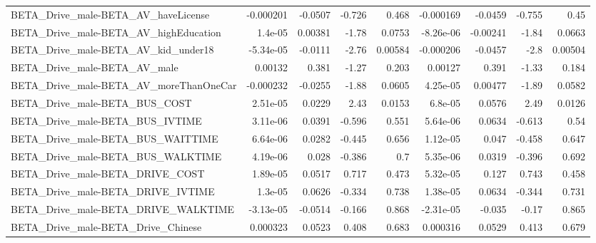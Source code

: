 \begin{tabular}{lrrrrrrrr}
BETA\_Drive\_male-BETA\_AV\_haveLicense                &   -0.000201 &      -0.0507 &   -0.726 &    0.468 &  -0.000169 &     -0.0459 &       -0.755 &          0.45 \\
BETA\_Drive\_male-BETA\_AV\_highEducation              &     1.4e-05 &      0.00381 &    -1.78 &   0.0753 &  -8.26e-06 &    -0.00241 &        -1.84 &        0.0663 \\
BETA\_Drive\_male-BETA\_AV\_kid\_under18                &   -5.34e-05 &      -0.0111 &    -2.76 &  0.00584 &  -0.000206 &     -0.0457 &         -2.8 &       0.00504 \\
BETA\_Drive\_male-BETA\_AV\_male                       &     0.00132 &        0.381 &    -1.27 &    0.203 &    0.00127 &       0.391 &        -1.33 &         0.184 \\
BETA\_Drive\_male-BETA\_AV\_moreThanOneCar             &   -0.000232 &      -0.0255 &    -1.88 &   0.0605 &   4.25e-05 &     0.00477 &        -1.89 &        0.0582 \\
BETA\_Drive\_male-BETA\_BUS\_COST                      &    2.51e-05 &       0.0229 &     2.43 &   0.0153 &    6.8e-05 &      0.0576 &         2.49 &        0.0126 \\
BETA\_Drive\_male-BETA\_BUS\_IVTIME                    &    3.11e-06 &       0.0391 &   -0.596 &    0.551 &   5.64e-06 &      0.0634 &       -0.613 &          0.54 \\
BETA\_Drive\_male-BETA\_BUS\_WAITTIME                  &    6.64e-06 &       0.0282 &   -0.445 &    0.656 &   1.12e-05 &       0.047 &       -0.458 &         0.647 \\
BETA\_Drive\_male-BETA\_BUS\_WALKTIME                  &    4.19e-06 &        0.028 &   -0.386 &      0.7 &   5.35e-06 &      0.0319 &       -0.396 &         0.692 \\
BETA\_Drive\_male-BETA\_DRIVE\_COST                    &    1.89e-05 &       0.0517 &    0.717 &    0.473 &   5.32e-05 &       0.127 &        0.743 &         0.458 \\
BETA\_Drive\_male-BETA\_DRIVE\_IVTIME                  &     1.3e-05 &       0.0626 &   -0.334 &    0.738 &   1.38e-05 &      0.0634 &       -0.344 &         0.731 \\
BETA\_Drive\_male-BETA\_DRIVE\_WALKTIME                &   -3.13e-05 &      -0.0514 &   -0.166 &    0.868 &  -2.31e-05 &      -0.035 &        -0.17 &         0.865 \\
BETA\_Drive\_male-BETA\_Drive\_Chinese                 &    0.000323 &       0.0523 &    0.408 &    0.683 &   0.000316 &      0.0529 &        0.413 &         0.679 \\

\end{tabular}
